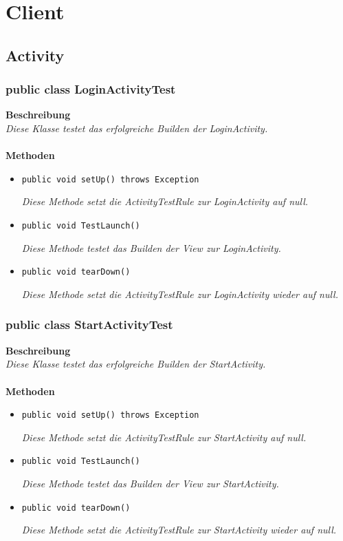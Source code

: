 \documentclass[a4paper]{scrreprt}
\begin{document}
	\section{Client}
	\subsection{Activity}
	\subsubsection{public class LoginActivityTest}
	\textbf{Beschreibung}\\
	\textit{Diese Klasse testet das erfolgreiche Builden der LoginActivity.}\\
	\\	
	\textbf{Methoden}
	\begin{itemize}
		
		\item\texttt{{public void setUp() throws Exception}}
		
		\textit{Diese Methode setzt die ActivityTestRule zur LoginActivity auf null.}
		
		\item\texttt{{public void TestLaunch()}}
		
		\textit{Diese Methode testet das Builden der View zur LoginActivity.}
		
		\item\texttt{{public void tearDown()}}
		
		\textit{Diese Methode setzt die ActivityTestRule zur LoginActivity wieder auf null.}
		
		
	\end{itemize}
	\subsubsection{public class StartActivityTest}
	\textbf{Beschreibung}\\
	\textit{Diese Klasse testet das erfolgreiche Builden der StartActivity.}\\
	\\	
	\textbf{Methoden}
	\begin{itemize}
		
		\item\texttt{{public void setUp() throws Exception}}
		
		\textit{Diese Methode setzt die ActivityTestRule zur StartActivity auf null.}
		
		\item\texttt{{public void TestLaunch()}}
		
		\textit{Diese Methode testet das Builden der View zur StartActivity.}
		
		\item\texttt{{public void tearDown()}}
		
		\textit{Diese Methode setzt die ActivityTestRule zur StartActivity wieder auf null.}
		
		
	\end{itemize}
\end{document}
